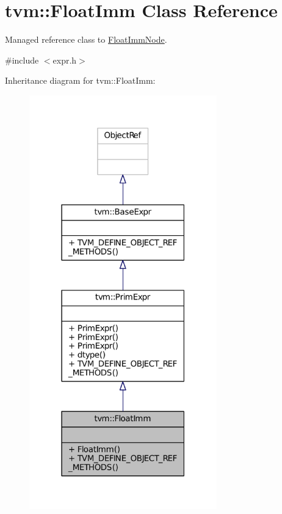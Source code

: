 \hypertarget{classtvm_1_1FloatImm}{}\section{tvm\+:\+:Float\+Imm Class Reference}
\label{classtvm_1_1FloatImm}


Managed reference class to \hyperlink{classtvm_1_1FloatImmNode}{Float\+Imm\+Node}.  




{\ttfamily \#include $<$expr.\+h$>$}



Inheritance diagram for tvm\+:\+:Float\+Imm\+:
\nopagebreak
\begin{figure}[H]
\begin{center}
\leavevmode
\includegraphics[width=230pt]{classtvm_1_1FloatImm__inherit__graph}
\end{center}
\end{figure}


